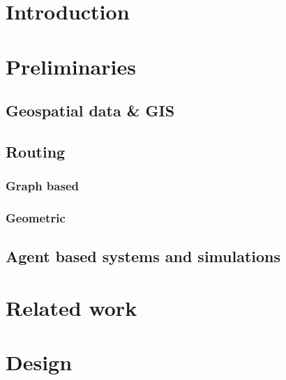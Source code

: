 \documentclass[
	11pt,
	a4paper,
	usegeometry,
	twoside,
	openright,
	toc=chapterentrywithdots
]{scrbook}
\begin{document}
	
	

	\restoregeometry
	
	\tableofcontents
	\thispagestyle{empty}
	\newpage
	
	\listoftodos
	\newpage
	
	\chapter{Introduction}
	
		
	
	\chapter{Preliminaries}
	
		\section{Geospatial data \& GIS}
		
		\section{Routing}
		
		
			\subsection{Graph based}
		
			\subsection{Geometric}
		
		\section{Agent based systems and simulations}
		
	\chapter{Related work}
	
	\chapter{Design}
		
\end{document}
